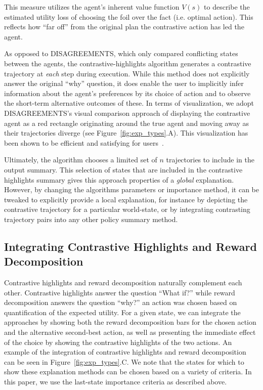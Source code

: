 \documentclass{ecai}
\begin{document}
This measure utilizes the agent's inherent value function $V(s)$ to describe the estimated utility loss of choosing the foil over the fact (i.e. optimal action). This reflects how ``far off'' from the original plan the contrastive action has led the agent. 

As opposed to DISAGREEMENTS, which only compared conflicting states between the agents, the contrastive-highlights algorithm generates a contrastive trajectory at \emph{each} step during execution. While this method does not explicitly answer the original ``why'' question, it does enable the user to implicitly infer information about the agent's preferences by its choice of action and to observe the short-term alternative outcomes of these. In terms of visualization, we adopt DISAGREEMENTS's visual comparison approach of displaying the contrastive agent as a red rectangle originating around the true agent and moving away as their trajectories diverge (see Figure~\ref{fig:exp_types}.A). This visualization has been shown to be efficient and satisfying for users~\cite{amitai2021don}.

Ultimately, the algorithm chooses a limited set of $n$ trajectories to include in the output summary. This selection of states that are included in the contrastive highlights summary gives this approach properties of a \emph{global} explanation. However, by changing the algorithms parameters or importance method, it can be tweaked to explicitly provide a local explanation, for instance by depicting the contrastive trajectory for a particular world-state, or by integrating contrasting trajectory pairs into any other policy summary method. 

\subsection{Integrating Contrastive Highlights and Reward Decomposition}
Contrastive highlights and reward decomposition naturally complement each other. Contrastive highlights answer the question ``What if?'' while reward decomposition answers the question ``why?'' an action was chosen based on quantification of the expected utility. For a given state, we can integrate the approaches by showing both the reward decomposition bars for the chosen action and the alternative second-best action, as well as presenting the immediate effect of the choice by showing the contrastive highlights of the two actions. An example of the integration of contrastive highlights and reward decomposition can be seen in Figure~\ref{fig:exp_types}.C. 
We note that the states for which to show these explanation methods can be chosen based on a variety of criteria. In this paper, we use the last-state importance criteria as described above.
\end{document}
